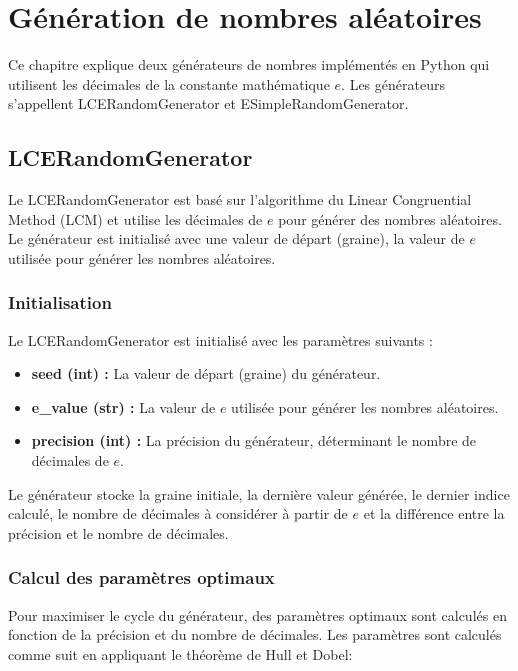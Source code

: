 \documentclass{article}
\begin{document}
\section{Génération de nombres aléatoires}
Ce chapitre explique deux générateurs de nombres implémentés en Python qui utilisent les décimales de la constante mathématique \(e\). Les générateurs s'appellent LCERandomGenerator et ESimpleRandomGenerator.

\subsection{LCERandomGenerator}

Le LCERandomGenerator est basé sur l'algorithme du Linear Congruential Method (LCM) et utilise les décimales de \(e\) pour générer des nombres aléatoires. Le générateur est initialisé avec une valeur de départ (graine), la valeur de \(e\) utilisée pour générer les nombres aléatoires.

\subsubsection{Initialisation}

Le LCERandomGenerator est initialisé avec les paramètres suivants :

\begin{itemize}
    \item \textbf{seed (int) :} La valeur de départ (graine) du générateur.
    \item \textbf{e\_value (str) :} La valeur de \(e\) utilisée pour générer les nombres aléatoires.
    \item \textbf{precision (int) :} La précision du générateur, déterminant le nombre de décimales de \(e\).
\end{itemize}

Le générateur stocke la graine initiale, la dernière valeur générée, le dernier indice calculé, le nombre de décimales à considérer à partir de \(e\) et la différence entre la précision et le nombre de décimales.

\subsubsection{Calcul des paramètres optimaux}

Pour maximiser le cycle du générateur, des paramètres optimaux sont calculés en fonction de la précision et du nombre de décimales. Les paramètres sont calculés comme suit en appliquant le théorème de Hull et Dobel:
\end{document}
